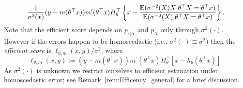 {\begin{equation}\label{eq:eff_score_smooth_def}
\frac{1}{\sigma^2(x)}(y-m(\theta^\top x)) m^\prime(\theta^\top x)  H_\theta^\top \left\lbrace x -  \frac{\mathbb{E}(\sigma^{-2}(X)X|\theta^\top X=\theta^\top x)}{\mathbb{E}(\sigma^{-2}(X)|\theta^\top X=\theta^\top x)}\right\rbrace.
\end{equation}
Note that the efficient score depends on $p_{\epsilon|X}$ and $p_X$ only through $\sigma^2(\cdot)$. However if the errors happen to be homoscedastic (i.e., $\sigma^2(\cdot)\equiv\sigma^2$) then the \textit{efficient score} is $\ell_{\theta,m} (x,y)/\sigma^2$, where 
\begin{equation} \label{eq:EffScoreCLSE}
 \ell_{\theta,m} (x,y) := (y-m(\theta^\top x)) m^\prime(\theta^\top x) H_\theta^\top [  x -h_{\theta}(\theta^\top x) ].
 \end{equation}
 As $\sigma^2(\cdot)$ is unknown we restrict ourselves to efficient estimation under homoscedastic error; see Remark~\ref{rem:Efficency_general} for a brief discussion.  
 



}
